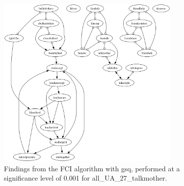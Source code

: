 \begin{figure}[htbp]
    \centering
    \includegraphics[width=0.8\textwidth]{Report/final_report/pictures/FCI_gsq_0.001_all_UA_27_talkmother.png}
    \caption{Findings from the FCI algorithm with gsq, performed at a significance level of 0.001 for all_UA_27_talkmother.}
    \label{fig:fci_gsq_0.001all_UA_27_talkmother}
\end{figure}
